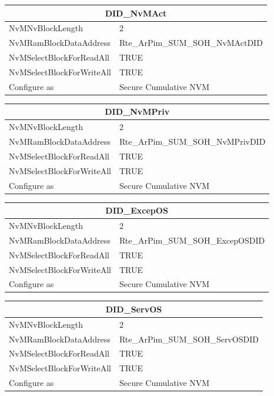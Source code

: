 \begin{tabular}{|l|p{8cm}|}\hline
\multicolumn{2}{|c|}{\textbf{DID\_NvMAct}}\\\hline
NvMNvBlockLength&2\\\hline
NvMRamBlockDataAddress&Rte\_ArPim\_SUM\_SOH\_NvMActDID\\\hline
NvMSelectBlockForReadAll&TRUE\\\hline
NvMSelectBlockForWriteAll&TRUE\\\hline
Configure as&Secure Cumulative NVM\\\hline
\end{tabular}

\begin{tabular}{|l|p{8cm}|}\hline
\multicolumn{2}{|c|}{\textbf{DID\_NvMPriv}}\\\hline
NvMNvBlockLength&2\\\hline
NvMRamBlockDataAddress&Rte\_ArPim\_SUM\_SOH\_NvMPrivDID\\\hline
NvMSelectBlockForReadAll&TRUE\\\hline
NvMSelectBlockForWriteAll&TRUE\\\hline
Configure as&Secure Cumulative NVM\\\hline
\end{tabular}


\begin{tabular}{|l|p{8cm}|}\hline
\multicolumn{2}{|c|}{\textbf{DID\_ExcepOS}}\\\hline
NvMNvBlockLength&2\\\hline
NvMRamBlockDataAddress&Rte\_ArPim\_SUM\_SOH\_ExcepOSDID\\\hline
NvMSelectBlockForReadAll&TRUE\\\hline
NvMSelectBlockForWriteAll&TRUE\\\hline
Configure as&Secure Cumulative NVM\\\hline
\end{tabular}

\begin{tabular}{|l|p{8cm}|}\hline
\multicolumn{2}{|c|}{\textbf{DID\_ServOS}}\\\hline
NvMNvBlockLength&2\\\hline
NvMRamBlockDataAddress&Rte\_ArPim\_SUM\_SOH\_ServOSDID\\\hline
NvMSelectBlockForReadAll&TRUE\\\hline
NvMSelectBlockForWriteAll&TRUE\\\hline
Configure as&Secure Cumulative NVM\\\hline
\end{tabular}


